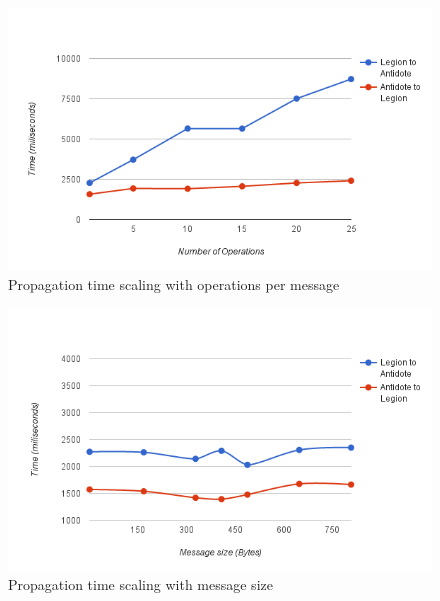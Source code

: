 \begin{figure}[H]
\centering
\includegraphics[scale=0.7]{files/graph1.png}
\caption{Propagation time scaling with operations per message}
\label{graph1}
\end{figure}

\begin{figure}[h]
\centering
\includegraphics[scale=0.7]{files/chart2.png}
\caption{Propagation time scaling with message size}
\label{chart2}
\end{figure}

